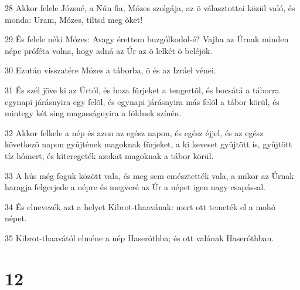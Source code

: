\par 28 Akkor felele Józsué, a Nún fia, Mózes szolgája, az õ választottai közül való, és monda: Uram, Mózes, tiltsd meg õket!
\par 29 És felele néki Mózes: Avagy érettem buzgólkodol-é? Vajha az Úrnak minden népe próféta volna, hogy adná az Úr az õ lelkét õ beléjök.
\par 30 Ezután visszatére Mózes a táborba, õ és az Izráel vénei.
\par 31 És szél jöve ki az Úrtól, és hoza fürjeket a tengertõl, és bocsátá a táborra egynapi járásnyira egy felõl, és egynapi járásnyira más felõl a tábor körül, és mintegy két sing magasságnyira a földnek színén.
\par 32 Akkor felkele a nép és azon az egész napon, és egész éjjel, és az egész következõ napon gyûjtének magoknak fürjeket, a ki keveset gyûjtött is, gyûjtött tíz hómert, és kiteregeték azokat magoknak a tábor körül.
\par 33 A hús még foguk között vala, és meg sem emésztették vala, a mikor az Úrnak haragja felgerjede a népre és megveré az Úr a népet igen nagy csapással.
\par 34 És elnevezék azt a helyet Kibrot-thaavának: mert ott temeték el a mohó népet.
\par 35 Kibrot-thaavától elméne a nép Haseróthba; és ott valának Haseróthban.

\chapter{12}

